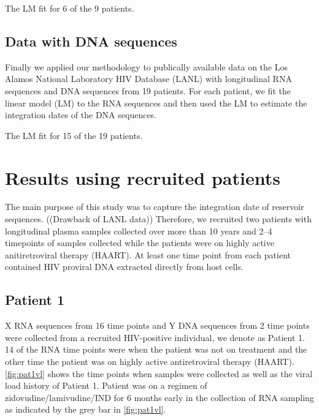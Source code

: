 \documentclass[12pt,onecolumn,twoside]{pnas-new}
\begin{document}
The LM fit for 6 of the 9 patients.

\subsection*{Data with DNA sequences}

Finally we applied our methodology to publically available data on the Los Alamos National Laboratory HIV Database (LANL) with longitudinal RNA sequences and DNA sequences from 19 patients.
For each patient, we fit the linear model (LM) to the RNA sequences and then used the LM to estimate the integration dates of the DNA sequences.

The LM fit for 15 of the 19 patients.

\section*{Results using recruited patients}

The main purpose of this study was to capture the integration date of reservoir sequences.
((Drawback of LANL data))
Therefore, we recruited two patients with longitudinal plasma samples collected over more than 10 years and 2--4 timepoints of samples collected while the patients were on highly active anitiretroviral therapy (HAART).
At least one time point from each patient contained HIV proviral DNA extracted directly from host cells.

\subsection*{Patient 1}

X RNA sequences from 16 time points and Y DNA sequences from 2 time points were collected from a recruited HIV-positive individual, we denote as Patient 1.
14 of the RNA time points were when the patient was not on treatment and the other time the patient was on highly active antiretroviral therapy (HAART). 
\cref{fig:pat1vl} shows the time points when samples were collected as well as the viral load history of Patient 1.
Patient was on a regimen of zidovudine/lamivudine/IND for 6 months early in the collection of RNA sampling as indicated by the grey bar in \cref{fig:pat1vl}.
\end{document}
